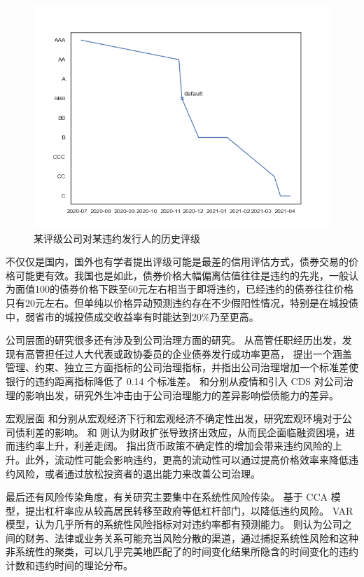 \begin{figure}[h]
	\centering
	\includegraphics[width=0.9\linewidth]{./data/rating_of_zg.png}
	\caption{某评级公司对某违约发行人的历史评级}
	\label{fig:rating_of_zg}
\end{figure}
不仅仅是国内，国外也有学者提出评级可能是最差的信用评估方式\cite{blochlinger2018ratings}，债券交易的价格可能更有效\cite{badoer2019relevance}。我国也是如此，债券价格大幅偏离估值往往是违约的先兆，一般认为面值100的债券价格下跌至60元左右相当于即将违约，已经违约的债券往往价格只有20元左右。但单纯以价格异动预测违约存在不少假阳性情况，特别是在城投债中，弱省市的城投债成交收益率有时能达到20\%乃至更高。

公司层面的研究很多还有涉及到公司治理方面的研究。
\Textcite{林晚发2018高管任职经历的得与失}从高管任职经历出发，发现有高管担任过人大代表或政协委员的企业债券发行成功率更高，
\Textcite{anginer2018corporate}提出一个涵盖管理、约束、独立三方面指标的公司治理指标，并指出公司治理增加一个标准差使银行的违约距离指标降低了 0.14 个标准差。
\Textcite{ding2021corporate}和\Textcite{subrahmanyam2017credit}分别从疫情和引入 CDS 对公司治理的影响出发，研究外生冲击由于公司治理能力的差异影响偿债能力的差异。

宏观层面
\Textcite{bai2019common}和\Textcite{bali2021macroeconomic}分别从宏观经济下行和宏观经济不确定性出发，研究宏观环境对于公司债利差的影响。
\Textcite{梅冬州2021财政扩张}和\Textcite{2020Fiscal} 则认为财政扩张导致挤出效应，从而民企面临融资困境，进而违约率上升，利差走阔。
\Textcite{王博2019货币政策不确定性}指出货币政策不确定性的增加会带来违约风险的上升。此外，流动性可能会影响违约\cite{brogaard2017stock}，更高的流动性可以通过提高价格效率来降低违约风险，或者通过放松投资者的退出能力来改善公司治理。

最后还有风险传染角度，有关研究主要集中在系统性风险传染。
\Textcite{苟文均2016债务杠杆与系统性风险传染机制}基于 CCA 模型，提出杠杆率应从较高居民转移至政府等低杠杆部门，以降低违约风险。
\Textcite{2020Do} VAR 模型，认为几乎所有的系统性风险指标对对违约率都有预测能力。
\Textcite{azizpour2018exploring}则认为公司之间的财务、法律或业务关系可能充当风险分散的渠道，通过捕捉系统性风险和这种非系统性的聚类，可以几乎完美地匹配了的时间变化结果所隐含的时间变化的违约计数和违约时间的理论分布。
